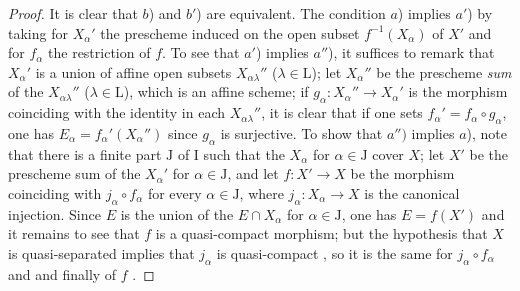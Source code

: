 \begin{proof}
It is clear that $b$) and $b'$) are equivalent.
The condition $a$) implies $a'$) by taking for $X_\alpha'$ the prescheme induced on the open subset $f^{-1}(X_\alpha)$ of $X'$ and for $f_\alpha$ the restriction of $f$.
To see that $a'$) implies $a''$), it suffices to remark that $X_\alpha'$ is a union of affine open subsets $X_{\alpha\lambda}''$ ($\lambda\in\mathrm{L}$); let $X_\alpha''$ be the prescheme \emph{sum} of the $X_{\alpha\lambda}''$ ($\lambda\in\mathrm{L}$), which is an affine scheme; if $g_\alpha:X_\alpha''\to X_\alpha'$ is the morphism coinciding with the identity in each $X_{\alpha\lambda}''$, it is clear that if one sets $f_\alpha'=f_\alpha\circ g_\alpha$, one has $E_\alpha=f_\alpha'(X_\alpha'')$ since $g_\alpha$ is surjective.
To show that $a'')$ implies $a$), note that there is a finite part $\mathrm{J}$ of $\mathrm{I}$ such that the $X_\alpha$ for $\alpha\in\mathrm{J}$ cover $X$; let $X'$ be the prescheme sum of the $X_\alpha'$ for $\alpha\in\mathrm{J}$, and let $f:X'\to X$ be the morphism coinciding with $j_\alpha\circ f_\alpha$ for every $\alpha\in\mathrm{J}$, where $j_\alpha:X_\alpha\to X$ is the canonical injection.
Since $E$ is the union of the $E\cap X_\alpha$ for $\alpha\in\mathrm{J}$, one has $E=f(X')$ and it remains to see that $f$ is a quasi-compact morphism; but the hypothesis that $X$ is quasi-separated implies that $j_\alpha$ is quasi-compact , so it is the same for $j_\alpha\circ f_\alpha$  and  and finally of $f$ .



\end{proof}
